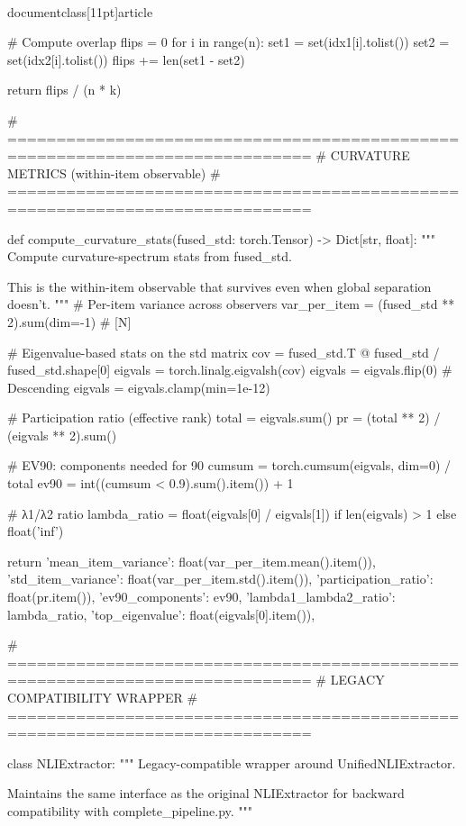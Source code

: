 \\documentclass[11pt]{article}
\begin{document}
\begin{CodeBlock}
    # Compute overlap
    flips = 0
    for i in range(n):
        set1 = set(idx1[i].tolist())
        set2 = set(idx2[i].tolist())
        flips += len(set1 - set2)
    
    return flips / (n * k)


# =============================================================================
# CURVATURE METRICS (within-item observable)
# =============================================================================

def compute_curvature_stats(fused_std: torch.Tensor) -> Dict[str, float]:
    """
    Compute curvature-spectrum stats from fused_std.
    
    This is the within-item observable that survives even when
    global separation doesn't.
    """
    # Per-item variance across observers
    var_per_item = (fused_std ** 2).sum(dim=-1)  # [N]
    
    # Eigenvalue-based stats on the std matrix
    cov = fused_std.T @ fused_std / fused_std.shape[0]
    eigvals = torch.linalg.eigvalsh(cov)
    eigvals = eigvals.flip(0)  # Descending
    eigvals = eigvals.clamp(min=1e-12)
    
    # Participation ratio (effective rank)
    total = eigvals.sum()
    pr = (total ** 2) / (eigvals ** 2).sum()
    
    # EV90: components needed for 90%
    cumsum = torch.cumsum(eigvals, dim=0) / total
    ev90 = int((cumsum < 0.9).sum().item()) + 1
    
    # λ1/λ2 ratio
    lambda_ratio = float(eigvals[0] / eigvals[1]) if len(eigvals) > 1 else float('inf')
    
    return {
        'mean_item_variance': float(var_per_item.mean().item()),
        'std_item_variance': float(var_per_item.std().item()),
        'participation_ratio': float(pr.item()),
        'ev90_components': ev90,
        'lambda1_lambda2_ratio': lambda_ratio,
        'top_eigenvalue': float(eigvals[0].item()),
    }


# =============================================================================
# LEGACY COMPATIBILITY WRAPPER
# =============================================================================

class NLIExtractor:
    """
    Legacy-compatible wrapper around UnifiedNLIExtractor.
    
    Maintains the same interface as the original NLIExtractor for
    backward compatibility with complete_pipeline.py.
    """
    

\end{CodeBlock}
\end{document}
